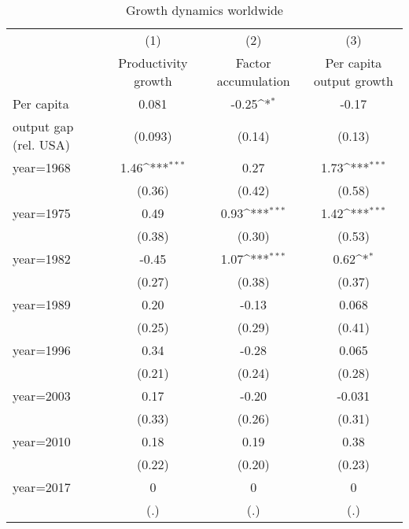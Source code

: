 \begin{sidewaystable}[htbp]\centering
\def\sym#1{\ifmmode^{#1}\else\(^{#1}\)\fi}
\caption{Growth dynamics worldwide}
\begin{tabular}{l*{3}{c}}
\hline\hline
                &\multicolumn{1}{c}{(1)}&\multicolumn{1}{c}{(2)}&\multicolumn{1}{c}{(3)}\\
                &\multicolumn{1}{c}{Productivity growth}&\multicolumn{1}{c}{Factor accumulation}&\multicolumn{1}{c}{Per capita output growth}\\
\hline
Per capita      &    0.081         &    -0.25\sym{*}  &    -0.17         \\
output gap (rel. USA)&  (0.093)         &   (0.14)         &   (0.13)         \\
[1em]
year=1968       &     1.46\sym{***}&     0.27         &     1.73\sym{***}\\
                &   (0.36)         &   (0.42)         &   (0.58)         \\
[1em]
year=1975       &     0.49         &     0.93\sym{***}&     1.42\sym{***}\\
                &   (0.38)         &   (0.30)         &   (0.53)         \\
[1em]
year=1982       &    -0.45         &     1.07\sym{***}&     0.62\sym{*}  \\
                &   (0.27)         &   (0.38)         &   (0.37)         \\
[1em]
year=1989       &     0.20         &    -0.13         &    0.068         \\
                &   (0.25)         &   (0.29)         &   (0.41)         \\
[1em]
year=1996       &     0.34         &    -0.28         &    0.065         \\
                &   (0.21)         &   (0.24)         &   (0.28)         \\
[1em]
year=2003       &     0.17         &    -0.20         &   -0.031         \\
                &   (0.33)         &   (0.26)         &   (0.31)         \\
[1em]
year=2010       &     0.18         &     0.19         &     0.38         \\
                &   (0.22)         &   (0.20)         &   (0.23)         \\
[1em]
year=2017       &        0         &        0         &        0         \\
                &      (.)         &      (.)         &      (.)         \\

\end{tabular}
\end{sidewaystable}
